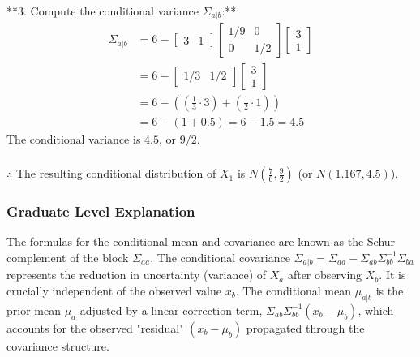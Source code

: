 \documentclass{article}
\begin{document}
**3. Compute the conditional variance $\Sigma_{a|b}$:**
\begin{align*}
    \Sigma_{a|b} &= 6 - \begin{bmatrix} 3 & 1 \end{bmatrix} \begin{bmatrix} 1/9 & 0 \\ 0 & 1/2 \end{bmatrix} \begin{bmatrix} 3 \\ 1 \end{bmatrix} \\
              &= 6 - \begin{bmatrix} 1/3 & 1/2 \end{bmatrix} \begin{bmatrix} 3 \\ 1 \end{bmatrix} \\
              &= 6 - \left( \left(\frac{1}{3} \cdot 3\right) + \left(\frac{1}{2} \cdot 1\right) \right) \\
              &= 6 - (1 + 0.5) = 6 - 1.5 = 4.5
\end{align*}
The conditional variance is $4.5$, or $9/2$.

\subsubsection*{\normalfont}{$\therefore$ The resulting conditional distribution of $X_1$ is $N\left(\frac{7}{6}, \frac{9}{2}\right)$ (or $N(1.167, 4.5)$).}

\subsubsection*{Graduate Level Explanation}
The formulas for the conditional mean and covariance are known as the Schur complement of the block $\Sigma_{aa}$. The conditional covariance $\Sigma_{a|b} = \Sigma_{aa} - \Sigma_{ab} \Sigma_{bb}^{-1} \Sigma_{ba}$ represents the reduction in uncertainty (variance) of $X_a$ after observing $X_b$. It is crucially independent of the observed value $x_b$. The conditional mean $\mu_{a|b}$ is the prior mean $\mu_a$ adjusted by a linear correction term, $\Sigma_{ab} \Sigma_{bb}^{-1} (x_b - \mu_b)$, which accounts for the observed "residual" $(x_b - \mu_b)$ propagated through the covariance structure.
\end{document}
